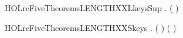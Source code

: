 \begin{SaveVerbatim}{HOLrcFiveTheoremsLENGTHXXLkeysSup}
\HOLTokenTurnstile{} \HOLSymConst{\HOLTokenForall{}} .  (  ) \HOLSymConst{=} 
\end{SaveVerbatim}
\newcommand{\HOLrcFiveTheoremsLENGTHXXLkeysSup}{\UseVerbatim{HOLrcFiveTheoremsLENGTHXXLkeysSup}}
\begin{SaveVerbatim}{HOLrcFiveTheoremsLENGTHXXSkeys}
\HOLTokenTurnstile{} \HOLSymConst{\HOLTokenForall{}}.  ( ) \HOLSymConst{=}  \HOLSymConst{\HOLTokenProd{}} ( \HOLSymConst{\ensuremath{+}} )
\end{SaveVerbatim}
\newcommand{\HOLrcFiveTheoremsLENGTHXXSkeys}{\UseVerbatim{HOLrcFiveTheoremsLENGTHXXSkeys}}
